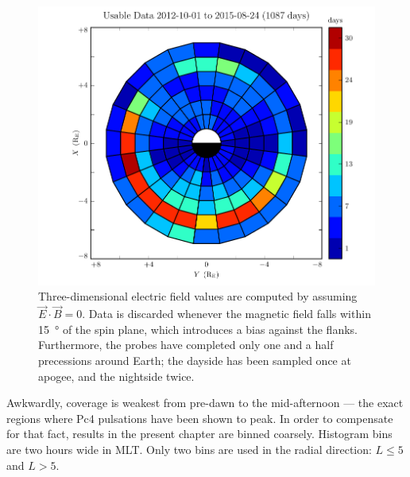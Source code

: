 \begin{figure}[!htb]
    \centering
    \includegraphics[width=\textwidth]{figures/pos_all_sharp.pdf}
    \caption[Distribution of Usable Van Allen Probe Data: Fine Resolution]{
      Three-dimensional electric field values are computed by assuming $\vec{E} \cdot \vec{B} = 0$. Data is discarded whenever the magnetic field falls within \SI{15}{\degree} of the spin plane, which introduces a bias against the flanks. Furthermore, the probes have completed only one and a half precessions around Earth; the dayside has been sampled once at apogee, and the nightside twice. 
    }
    \label{fig_pos_all_sharp}
\end{figure}

Awkwardly, coverage is weakest from pre-dawn to the mid-afternoon --- the exact regions where Pc4 pulsations have been shown to peak. In order to compensate for that fact, results in the present chapter are binned coarsely. Histogram bins are two hours wide in MLT. Only two bins are used in the radial direction: $L \leq 5$ and $L > 5$. 



